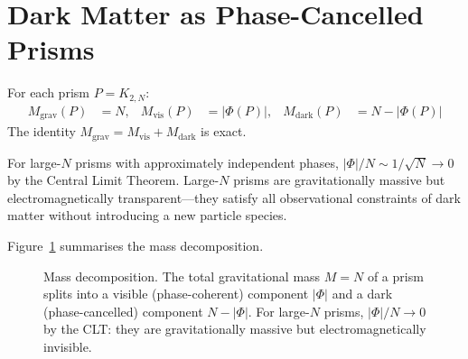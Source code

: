 \documentclass[11pt, a4paper, openany]{book}
\newcounter{thm}[chapter]
\begin{document}
\section{Dark Matter as Phase-Cancelled Prisms}\label{sec:dark-matter}

\begin{theorem}\label{thm:phase-coherence}
For each prism $P = K_{2,N}$:
\begin{align}
  M_{\mathrm{grav}}(P) &= N, & M_{\mathrm{vis}}(P) &= |\Phi(P)|, & M_{\mathrm{dark}}(P) &= N - |\Phi(P)|
\end{align}
The identity $M_{\mathrm{grav}} = M_{\mathrm{vis}} + M_{\mathrm{dark}}$ is exact.
\end{theorem}

\begin{corollary}\label{cor:clt}
For large-$N$ prisms with approximately independent phases, $|\Phi|/N \sim 1/\sqrt{N} \to 0$ by the Central Limit Theorem. Large-$N$ prisms are gravitationally massive but electromagnetically transparent---they satisfy all observational constraints of dark matter without introducing a new particle species.
\end{corollary}

\noindent
Figure~\ref{fig:dark-matter-decomposition} summarises the mass
decomposition.

\begin{figure}[ht]
\centering
{}
\caption{Mass decomposition.  The total gravitational mass $M = N$ of
a prism splits into a visible (phase-coherent) component $|\Phi|$ and
a dark (phase-cancelled) component $N - |\Phi|$.  For large-$N$
prisms, $|\Phi|/N \to 0$ by the CLT: they are gravitationally massive
but electromagnetically invisible.}
\label{fig:dark-matter-decomposition}
\end{figure}
\end{document}
